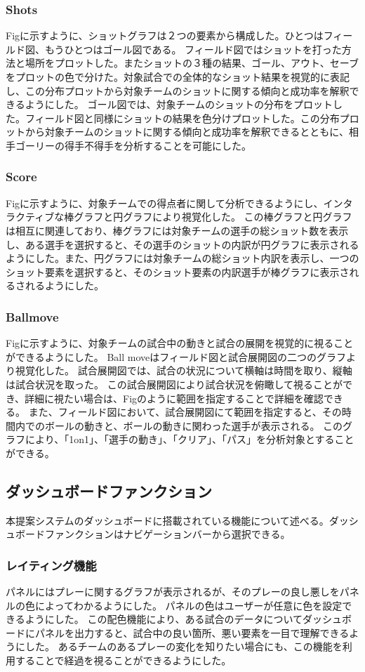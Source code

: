 \documentclass[sotsuron]{kuee}
\begin{document}
			\subsubsection{Shots}
			Figに示すように、ショットグラフは２つの要素から構成した。ひとつはフィールド図、もうひとつはゴール図である。
			フィールド図ではショットを打った方法と場所をプロットした。またショットの３種の結果、ゴール、アウト、セーブをプロットの色で分けた。対象試合での全体的なショット結果を視覚的に表記し、この分布プロットから対象チームのショットに関する傾向と成功率を解釈できるようにした。
			ゴール図では、対象チームのショットの分布をプロットした。フィールド図と同様にショットの結果を色分けプロットした。この分布プロットから対象チームのショットに関する傾向と成功率を解釈できるとともに、相手ゴーリーの得手不得手を分析することを可能にした。
			\subsubsection{Score}
			Figに示すように、対象チームでの得点者に関して分析できるようにし、インタラクティブな棒グラフと円グラフにより視覚化した。
			この棒グラフと円グラフは相互に関連しており、棒グラフには対象チームの選手の総ショット数を表示し、ある選手を選択すると、その選手のショットの内訳が円グラフに表示されるようにした。また、円グラフには対象チームの総ショット内訳を表示し、一つのショット要素を選択すると、そのショット要素の内訳選手が棒グラフに表示されるされるようにした。
			\subsubsection{Ballmove}
			Figに示すように、対象チームの試合中の動きと試合の展開を視覚的に視ることができるようにした。
			Ball moveはフィールド図と試合展開図の二つのグラフより視覚化した。
			試合展開図では、試合の状況について横軸は時間を取り、縦軸は試合状況を取った。
			この試合展開図により試合状況を俯瞰して視ることができ、詳細に視たい場合は、Figのように範囲を指定することで詳細を確認できる。
			また、フィールド図において、試合展開図にて範囲を指定すると、その時間内でのボールの動きと、ボールの動きに関わった選手が表示される。
			このグラフにより、「1on1」、「選手の動き」、「クリア」、「パス」を分析対象とすることができる。
		\subsection{ダッシュボードファンクション}
			本提案システムのダッシュボードに搭載されている機能について述べる。ダッシュボードファンクションはナビゲーションバーから選択できる。
			\subsubsection{レイティング機能}
			パネルにはプレーに関するグラフが表示されるが、そのプレーの良し悪しをパネルの色によってわかるようにした。
			パネルの色はユーザーが任意に色を設定できるようにした。
			この配色機能により、ある試合のデータについてダッシュボードにパネルを出力すると、試合中の良い箇所、悪い要素を一目で理解できるようにした。
			あるチームのあるプレーの変化を知りたい場合にも、この機能を利用することで経過を視ることができるようにした。
\end{document}

